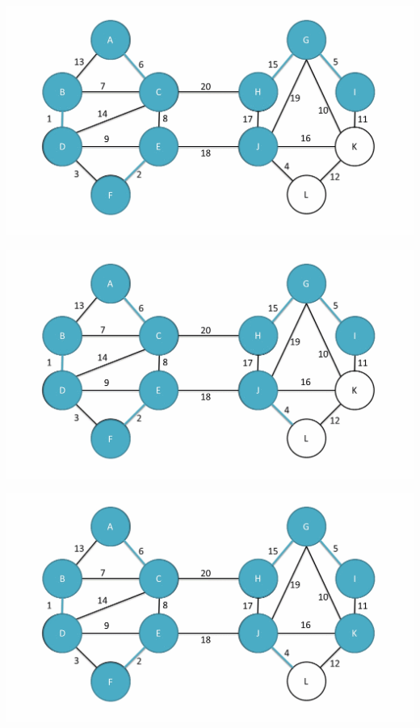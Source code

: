 \documentclass[
	11pt, %
]{beamer}
\begin{document}
\begin{frame}
    \includegraphics[width = 1\textwidth]{baruvka-example/frame_15_delay-1s.png}
\end{frame}
\begin{frame}
    \includegraphics[width = 1\textwidth]{baruvka-example/frame_16_delay-1s.png}
\end{frame}
\begin{frame}
    \includegraphics[width = 1\textwidth]{baruvka-example/frame_17_delay-1s.png}
\end{frame}
\end{document}
